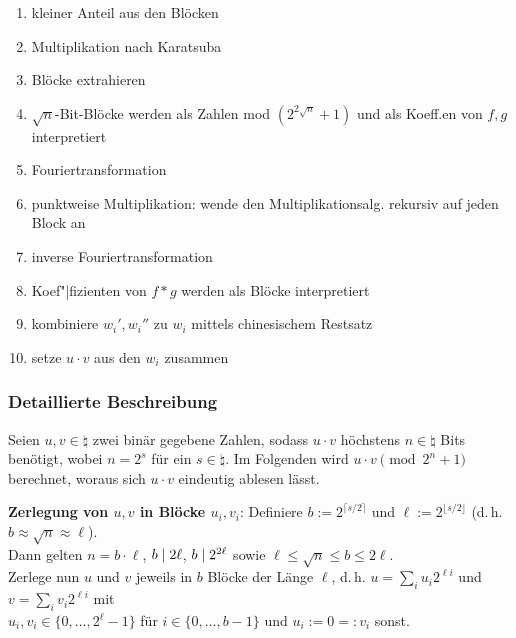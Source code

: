 \begin{enumerate}
    \item
    kleiner Anteil aus den Blöcken

    \item
    Multiplikation nach Karatsuba

    \item
    Blöcke extrahieren

    \item
    $\sqrt{n}$-Bit-Blöcke werden als Zahlen mod $(2^{2\sqrt{n}} + 1)$ und als Koeff.en
    von $f, g$ interpretiert

    \item
    Fouriertransformation

    \item
    punktweise Multiplikation: wende den Multiplikationsalg. rekursiv auf jeden Block an

    \item
    inverse Fouriertransformation

    \item
    Koef"|fizienten von $f \ast g$ werden als Blöcke interpretiert

    \item
    kombiniere $w_i', w_i''$ zu $w_i$ mittels chinesischem Restsatz

    \item
    setze $u \cdot v$ aus den $w_i$ zusammen
\end{enumerate}

\pagebreak

\subsubsection{%
    Detaillierte Beschreibung%
}

Seien $u, v \in \natural$ zwei binär gegebene Zahlen,
sodass $u \cdot v$ höchstens $n \in \natural$ Bits benötigt, wobei $n = 2^s$ für ein
$s \in \natural$.
Im Folgenden wird $u \cdot v \pmod{2^n + 1}$ berechnet, woraus sich $u \cdot v$ eindeutig ablesen
lässt.

\textbf{Zerlegung von $u, v$ in Blöcke $u_i, v_i$}:
Definiere $b := 2^{\lceil s/2 \rceil}$ und $\ell := 2^{\lfloor s/2 \rfloor}$
(d.\,h. $b \approx \sqrt{n} \approx \ell$).\\
Dann gelten $n = b \cdot \ell$, $b \mid 2\ell$, $b \mid 2^{2\ell}$ sowie
$\ell \le \sqrt{n} \le b \le 2\ell$.\\
Zerlege nun $u$ und $v$ jeweils in $b$ Blöcke der Länge $\ell$,
d.\,h. $u = \sum_i u_i 2^{\ell i}$ und $v = \sum_i v_i 2^{\ell i}$ mit\\
$u_i, v_i \in \{0, \dotsc, 2^\ell - 1\}$ für $i \in \{0, \dotsc, b - 1\}$ und
$u_i := 0 =: v_i$ sonst.


